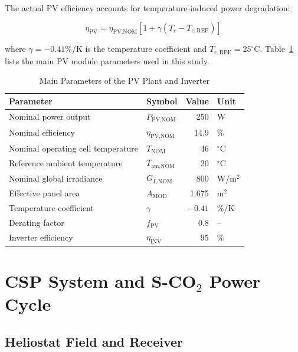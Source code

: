 \documentclass[journal]{IEEEtran}
\begin{document}
The actual PV efficiency accounts for temperature-induced power degradation:

\begin{equation}
\eta_{\text{PV}} = \eta_{\text{PV,NOM}} \left[1 + \gamma (T_c - T_{c,\text{REF}})\right]
\label{eq:eta_pv}
\end{equation}

where $\gamma = -0.41\%$/K is the temperature coefficient and $T_{c,\text{REF}} = 25^\circ$C. Table~\ref{tab:pv_params} lists the main PV module parameters used in this study.

\begin{table}[!t]
\centering
\caption{Main Parameters of the PV Plant and Inverter}
\label{tab:pv_params}
\begin{tabular}{llrl}
\toprule
\textbf{Parameter} & \textbf{Symbol} & \textbf{Value} & \textbf{Unit} \\
\midrule
Nominal power output & $P_{\text{PV,NOM}}$ & 250 & W \\
Nominal efficiency & $\eta_{\text{PV,NOM}}$ & 14.9 & \% \\
Nominal operating cell temperature & $T_{\text{NOM}}$ & 46 & $^\circ$C \\
Reference ambient temperature & $T_{\text{am,NOM}}$ & 20 & $^\circ$C \\
Nominal global irradiance & $G_{I,\text{NOM}}$ & 800 & W/m$^2$ \\
Effective panel area & $A_{\text{MOD}}$ & 1.675 & m$^2$ \\
Temperature coefficient & $\gamma$ & $-0.41$ & \%/K \\
Derating factor & $f_{\text{PV}}$ & 0.8 & -- \\
Inverter efficiency & $\eta_{\text{INV}}$ & 95 & \% \\
\bottomrule
\end{tabular}
\end{table}

\section{CSP System and S-CO$_2$ Power Cycle}
\label{sec:csp}

\subsection{Heliostat Field and Receiver}
\end{document}
